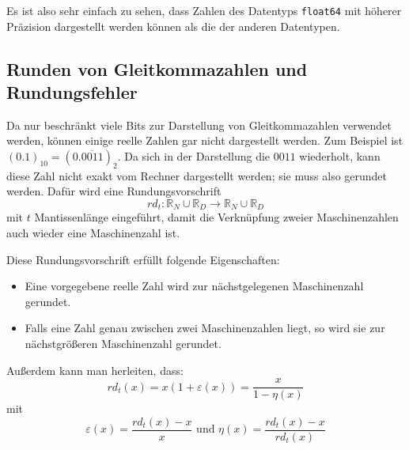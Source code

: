 \documentclass{scrartcl}
\begin{document}
Es ist also sehr einfach zu sehen, dass Zahlen des Datentyps \texttt{float64}
mit höherer Präzision dargestellt werden können als die der anderen Datentypen.

\subsection{Runden von Gleitkommazahlen und Rundungsfehler}
Da nur beschränkt viele Bits zur Darstellung von Gleitkommazahlen verwendet
werden, können einige reelle Zahlen gar nicht dargestellt werden. Zum Beispiel
ist \( (0.1)_{10} = (0. \overline{0011})_2 \). Da sich in der Darstellung die
\(0011\) wiederholt, kann diese Zahl nicht exakt vom Rechner dargestellt
werden; sie muss also gerundet werden. Dafür wird eine Rundungsvorschrift
\begin{equation*}
    rd_t: \mathbb{R}_N \cup \mathbb{R}_D \rightarrow \mathbb{R}_N \cup \mathbb{R}_D
\end{equation*}
mit \(t\) Mantissenlänge eingeführt, damit die Verknüpfung zweier Maschinenzahlen auch wieder eine
Maschinenzahl ist.

Diese Rundungsvorschrift erfüllt folgende Eigenschaften:
\begin{itemize}
    \item Eine vorgegebene reelle Zahl wird zur nächstgelegenen Maschinenzahl
          gerundet.
    \item Falls eine Zahl genau zwischen zwei Maschinenzahlen liegt, so wird
          sie zur nächstgrößeren Maschinenzahl gerundet.
\end{itemize}

Außerdem kann man herleiten, dass: \[ rd_t(x) = x(1+\varepsilon(x)) =
    \frac{x}{1-\eta(x)} \] mit \[ \varepsilon(x) = \frac{rd_t(x) - x}{x} \text{ und
    } \eta(x) = \frac{rd_t(x) - x}{rd_t(x)} \]
\end{document}
